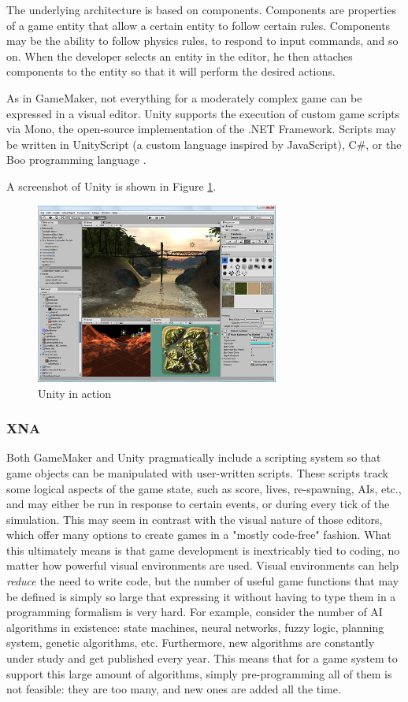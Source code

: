 The underlying architecture is based on components. Components are properties of a game entity that allow a certain entity to follow certain rules. Components may be the ability to follow physics rules, to respond to input commands, and so on. When the developer selects an entity in the editor, he then attaches components to the entity so that it will perform the desired actions.

As in GameMaker, not everything for a moderately complex game can be expressed in a visual editor. Unity supports the execution of custom game scripts via Mono, the open-source implementation of the .NET Framework. Scripts may be written in UnityScript (a custom language inspired by JavaScript), C\#, or the Boo programming language \cite{CHAPTER_3_BOO}.

A screenshot of Unity is shown in Figure \ref{fig:unity_in_action}.

\begin{figure}
\begin{center}
\includegraphics[width=8cm]{Pics/unity1.png}
\end{center}
\caption{Unity in action}
\label{fig:unity_in_action}
\end{figure}

\subsubsection{XNA}
Both GameMaker and Unity pragmatically include a scripting system so that game objects can be manipulated with user-written scripts. These scripts track some logical aspects of the game state, such as score, lives, re-spawning, AIs, etc., and may either be run in response to certain events, or during every tick of the simulation. This may seem in contrast with the visual nature of those editors, which offer many options to create games in a "mostly code-free" fashion. What this ultimately means is that game development is inextricably tied to coding, no matter how powerful visual environments are used. Visual environments can help \textit{reduce} the need to write code, but the number of useful game functions that may be defined is simply so large that expressing it without having to type them in a programming formalism is very hard. For example, consider the number of AI algorithms in existence: state machines, neural networks, fuzzy logic, planning system, genetic algorithms, etc. Furthermore, new algorithms are constantly under study and get published every year. This means that for a game system to support this large amount of algorithms, simply pre-programming all of them is not feasible: they are too many, and new ones are added all the time. 

